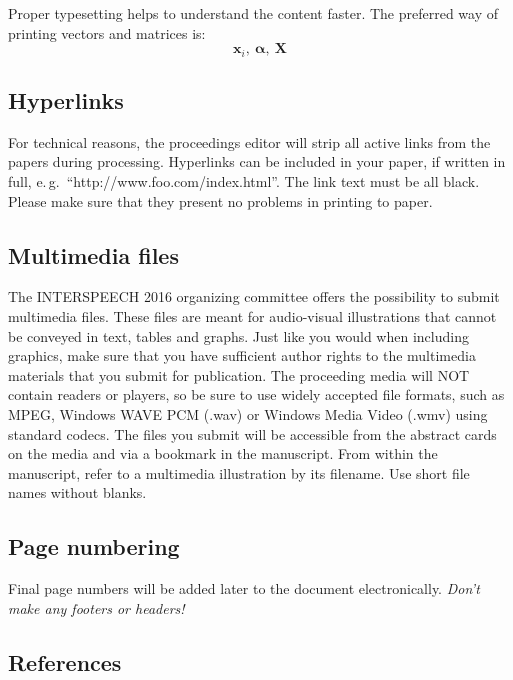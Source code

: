 \documentclass[a4paper]{article}
\def\vec#1{\ensuremath{\bm{{#1}}}}
\def\mat#1{\vec{#1}}
\begin{document}
      Proper typesetting helps to understand the content faster.
      The preferred way of printing vectors and matrices is:
      \begin{equation}
        \vec{x}_i,~\vec{\alpha},~\mat{X}
      \end{equation}

  
    \subsection{Hyperlinks}

      For technical reasons, the proceedings editor will strip all active links from the papers during processing. 
      Hyperlinks can be included in your paper, if written in full, e.\,g.\ ``http://www.foo.com/index.html''.
      The link text must be all black. 
      Please make sure that they present no problems in printing to paper.

  
    \subsection{Multimedia files}

      The INTERSPEECH 2016 organizing committee offers the possibility to submit multimedia files. 
      These files are meant for audio-visual illustrations that cannot be conveyed in text, tables and graphs.
      Just like you would when including graphics, make sure that you have sufficient author rights to the multimedia materials that you submit for publication. 
      The proceeding media will NOT contain readers or players, so be sure to use widely accepted file formats, such as MPEG, Windows WAVE PCM (.wav) or Windows Media Video (.wmv) using standard codecs.
      The files you submit will be accessible from the abstract cards on the media and via a bookmark in the manuscript.
      From within the manuscript, refer to a multimedia illustration by its filename. Use short file names without blanks.

  
    \subsection{Page numbering}

      Final page numbers will be added later to the document electronically.
      \emph{Don't make any footers or headers!}

  
    \subsection{References}
\end{document}
